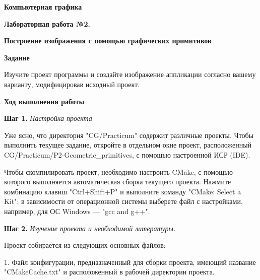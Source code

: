 \documentclass[a4paper,12pt]{article}
\theoremstyle{plain}
\begin{document}
\begin{center}
    \textbf{{\Large Компьютерная графика}}
    
    \textbf{{\large Лабораторная работа №2. }}
    
    \textbf{{\large Построение изображения с помощью графических примитивов}}
    \end{center}
    
    
    \textbf{Задание}
    
    Изучите проект программы и создайте изображение аппликации согласно вашему варианту, модифицировав исходный проект.
    
    
    
    \textbf{Ход выполнения работы}
    
    \textbf{Шаг 1.} \textit{Настройка проекта}
    
    Уже ясно, что директория "CG/Practicum" содержит различные проекты. Чтобы выполнить текущее задание, откройте в отдельном окне проект, расположенный CG/Practicum/P2-Geometric\_primitives, с помощью настроенной ИСР (IDE).

    Чтобы скомпилировать проект, необходимо настроить CMake, с помощью которого выполняется автоматическая сборка текущего проекта.
    Нажмите комбинацию клавиш "Ctrl+Shift+P" и выполните команду "CMake: Select a Kit"; в зависимости от операционной системы выберете файл с настройками, например, для ОС Windows --- "gcc and g++".


    
    
    
    \textbf{Шаг 2.} \textit{Изучение проекта и необходимой литературы.}
    
    Проект собирается из следующих основных файлов:
    
    1. Файл конфигурации, предназначенный для сборки проекта, имеющий название "CMakeCache.txt" и расположенный в рабочей директории проекта.
    
\end{document}

